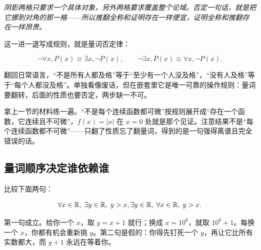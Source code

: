 \begin{center}

\emph{阴影两格只要求一个具体对象，另外两格要求覆盖整个论域。否定一句话，就是把它挪到对角的那一格——所以推翻全称和证明存在一样便宜，证明全称和推翻存在一样昂贵。}
\end{center}

这一进一退写成规则，就是量词否定律：

\[
\neg\forall x,P(x)\equiv\exists x,\neg P(x),
\qquad
\neg\exists x,P(x)\equiv\forall x,\neg P(x).
\]

翻回日常语言，``不是所有人都及格''等于``至少有一个人没及格''，``没有人及格''等于``每个人都没及格''。单独看像废话，但在嵌套里它是唯一可靠的操作规则：量词要翻转，后面的性质也要否定，两步缺一不可。

拿上一节的材料练一遍。``不是每个连续函数都可微''按规则展开成``存在一个函数，它连续且不可微''，\(f(x)=|x|\) 在 \(x=0\) 处就是那个见证。注意结果不是``每个连续函数都不可微''——只翻了性质忘了翻量词，得到的是一句强得离谱且完全错误的话。

\subsection{量词顺序决定谁依赖谁}

比较下面两句：

\[
\forall x\in\mathbb{R},\; \exists y\in\mathbb{R},\; y>x,
\space\space
\exists y\in\mathbb{R},\; \forall x\in\mathbb{R},\; y>x.
\]

第一句成立。给你一个 \(x\)，取 \(y=x+1\) 就行；换成 \(x=10^6\)，就取 \(10^6+1\)。每换一个 \(x\)，你都有机会重新挑 \(y\)。第二句是假的：你得先钉死一个 \(y\)，再让它比所有实数都大，而 \(y+1\) 永远在等着你。

